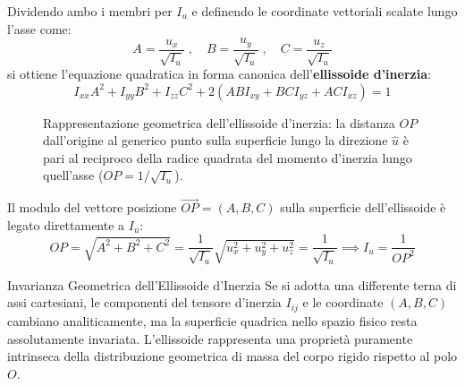 Dividendo ambo i membri per $I_u$ e definendo le coordinate vettoriali scalate lungo l'asse come:
\begin{equation}
    A = \frac{u_x}{\sqrt{I_u}} \; , \quad B = \frac{u_y}{\sqrt{I_u}} \; , \quad C = \frac{u_z}{\sqrt{I_u}}
\end{equation}
si ottiene l'equazione quadratica in forma canonica dell'\textbf{ellissoide d'inerzia}:
\begin{equation}
I_{xx} A^2 + I_{yy} B^2 + I_{zz} C^2 + 2(AB I_{xy} + BC I_{yz} + AC I_{xz}) = 1
\end{equation}

\begin{figure}[ht]
\centering
{}
\caption{Rappresentazione geometrica dell'ellissoide d'inerzia: la distanza $OP$ dall'origine al generico punto sulla superficie lungo la direzione $\hat{u}$ è pari al reciproco della radice quadrata del momento d'inerzia lungo quell'asse ($OP = 1/\sqrt{I_u}$).}
\end{figure}

Il modulo del vettore posizione $\vec{OP} = (A,B,C)$ sulla superficie dell'ellissoide è legato direttamente a $I_u$:
\begin{equation}
    OP = \sqrt{A^2 + B^2 + C^2} = \frac{1}{\sqrt{I_u}} \sqrt{u_x^2 + u_y^2 + u_z^2} = \frac{1}{\sqrt{I_u}} \implies I_u = \frac{1}{OP^2}
\end{equation}
\begin{osservazione}{Invarianza Geometrica dell'Ellissoide d'Inerzia}
Se si adotta una differente terna di assi cartesiani, le componenti del tensore d'inerzia $I_{ij}$ e le coordinate $(A,B,C)$ cambiano analiticamente, ma la superficie quadrica nello spazio fisico resta assolutamente invariata. L'ellissoide rappresenta una proprietà puramente intrinseca della distribuzione geometrica di massa del corpo rigido rispetto al polo $O$.
\end{osservazione}

